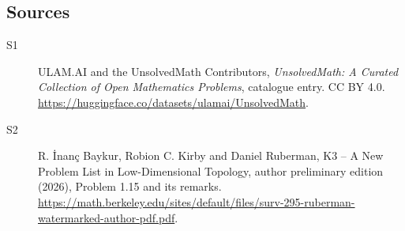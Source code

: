\documentclass[11pt]{article}
\begin{document}
\subsection{Sources}
\begin{description}
\item[\hypertarget{source:statement:1}{S1}] ULAM.AI and the UnsolvedMath Contributors, \emph{UnsolvedMath: A Curated Collection of Open Mathematics Problems}, catalogue entry. CC BY 4.0. \url{https://huggingface.co/datasets/ulamai/UnsolvedMath}.
\item[\hypertarget{source:statement:2}{S2}] R. \.{I}nan\c{c} Baykur, Robion C. Kirby and Daniel Ruberman, K3 -- A New Problem List in Low-Dimensional Topology, author preliminary edition (2026), Problem 1.15 and its remarks. \url{https://math.berkeley.edu/sites/default/files/surv-295-ruberman-watermarked-author-pdf.pdf}.
\end{description}
\label{end:statement}
\end{document}
